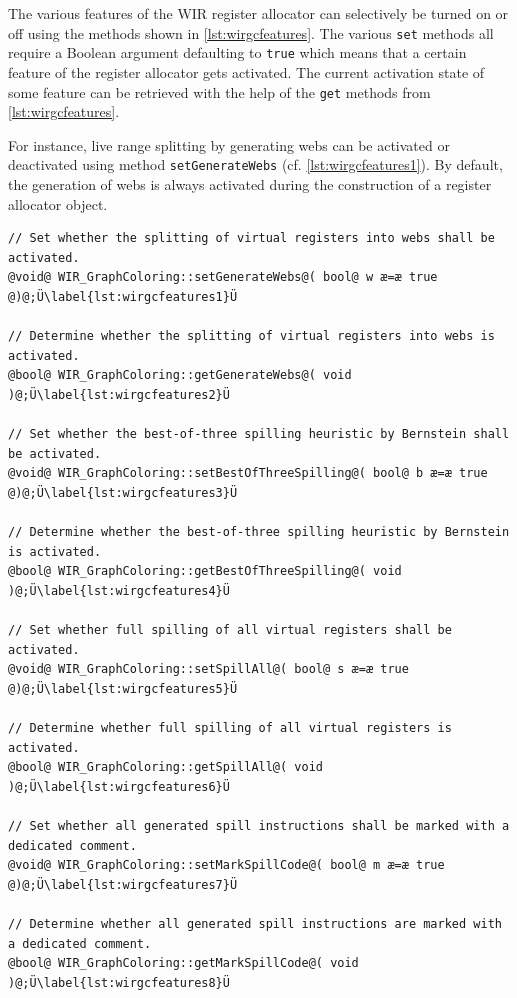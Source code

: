The various features of the \gls{WIR} register allocator can selectively be turned on or off using the methods shown in \cref{lst:wirgcfeatures}.
The various \texttt{set} methods all require a Boolean argument defaulting to \texttt{true} which means that a certain feature of the register allocator gets activated.
The current activation state of some feature can be retrieved with the help of the \texttt{get} methods from \cref{lst:wirgcfeatures}.

For instance, live range splitting by generating webs can be activated or deactivated using method \texttt{setGenerate\-Webs} (cf. \cref{lst:wirgcfeatures1}).
By default, the generation of webs is always activated during the construction of a register allocator object.

\begin{lstlisting}[style=code,float=!t,caption={Feature Activation of Class \texttt{WIR\_GraphColoring}},label=lst:wirgcfeatures]
// Set whether the splitting of virtual registers into webs shall be activated.
@void@ WIR_GraphColoring::setGenerateWebs@( bool@ w æ=æ true @)@;Ü\label{lst:wirgcfeatures1}Ü

// Determine whether the splitting of virtual registers into webs is activated.
@bool@ WIR_GraphColoring::getGenerateWebs@( void )@;Ü\label{lst:wirgcfeatures2}Ü

// Set whether the best-of-three spilling heuristic by Bernstein shall be activated.
@void@ WIR_GraphColoring::setBestOfThreeSpilling@( bool@ b æ=æ true @)@;Ü\label{lst:wirgcfeatures3}Ü

// Determine whether the best-of-three spilling heuristic by Bernstein is activated.
@bool@ WIR_GraphColoring::getBestOfThreeSpilling@( void )@;Ü\label{lst:wirgcfeatures4}Ü

// Set whether full spilling of all virtual registers shall be activated.
@void@ WIR_GraphColoring::setSpillAll@( bool@ s æ=æ true @)@;Ü\label{lst:wirgcfeatures5}Ü

// Determine whether full spilling of all virtual registers is activated.
@bool@ WIR_GraphColoring::getSpillAll@( void )@;Ü\label{lst:wirgcfeatures6}Ü

// Set whether all generated spill instructions shall be marked with a dedicated comment.
@void@ WIR_GraphColoring::setMarkSpillCode@( bool@ m æ=æ true @)@;Ü\label{lst:wirgcfeatures7}Ü

// Determine whether all generated spill instructions are marked with a dedicated comment.
@bool@ WIR_GraphColoring::getMarkSpillCode@( void )@;Ü\label{lst:wirgcfeatures8}Ü


\end{lstlisting}
